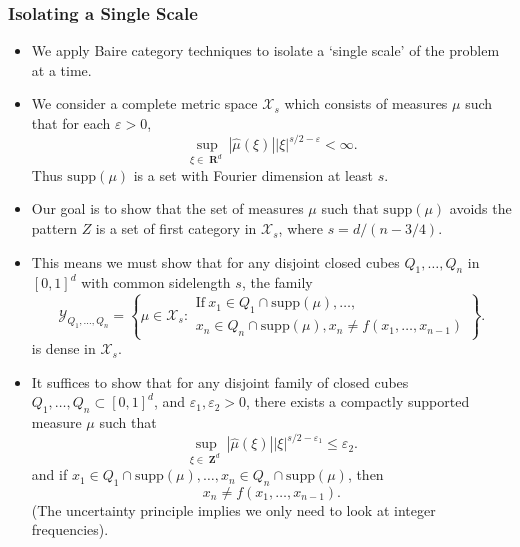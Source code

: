 \documentclass[usenames,dvipsnames,handout]{beamer}
\DeclareMathOperator{\RR}{\textbf{R}}
\DeclareMathOperator{\ZZ}{\textbf{Z}}
\begin{document}
\begin{frame}
    \frametitle{Isolating a Single Scale}

    \begin{itemize}
        \item We apply Baire category techniques to isolate a `single scale' of the problem at a time.

        \item We consider a complete metric space $\mathcal{X}_s$ which consists of measures $\mu$ such that for each $\varepsilon > 0$,
        \[ \sup_{\xi \in \RR^d} |\widehat{\mu}(\xi)| |\xi|^{s/2 - \varepsilon} < \infty. \]
        Thus $\text{supp}(\mu)$ is a set with Fourier dimension at least $s$.

        \item Our goal is to show that the set of measures $\mu$ such that $\text{supp}(\mu)$ avoids the pattern $Z$ is a set of first category in $\mathcal{X}_s$, where $s = d/(n-3/4)$.
    \end{itemize}
\end{frame}

\begin{frame}
\begin{itemize}
        \item This means we must show that for any disjoint closed cubes $Q_1, \dots, Q_n$ in $[0,1]^d$ with common sidelength $s$, the family
        \[ \mathcal{Y}_{Q_1,\dots,Q_n} = \left\{ \mu \in \mathcal{X}_s : \begin{array}{c} \text{If}\ x_1 \in Q_1 \cap \text{supp}(\mu), \dots,\\ x_n \in Q_n \cap \text{supp}(\mu), x_n \neq f(x_1,\dots,x_{n-1}) \end{array} \right\}. \]
        is dense in $\mathcal{X}_s$.

        \item It suffices to show that for any disjoint family of closed cubes $Q_1, \dots, Q_n \subset [0,1]^d$, and $\varepsilon_1,\varepsilon_2 > 0$, there exists a compactly supported measure $\mu$ such that
        \[ \sup_{\xi \in \ZZ^d} |\widehat{\mu}(\xi)| |\xi|^{s/2 - \varepsilon_1} \leq \varepsilon_2. \]
        and if $x_1 \in Q_1 \cap \text{supp}(\mu), \dots, x_n \in Q_n \cap \text{supp}(\mu)$, then
        \[ x_n \neq f(x_1,\dots,x_{n-1}). \]
        (The uncertainty principle implies we only need to look at integer frequencies).
\end{itemize}
\end{frame}
\end{document}
